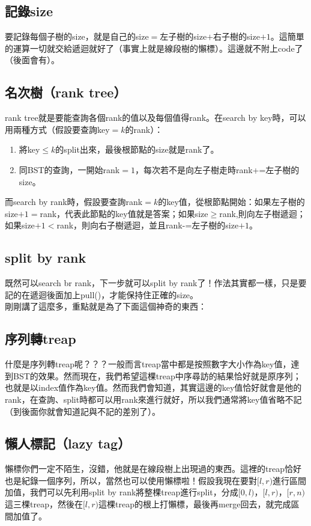\subsection{記錄size}
要記錄每個子樹的size，就是自己的size$=$左子樹的size$+$右子樹的size$+1$。這簡單的運算一切就交給遞迴就好了（事實上就是線段樹的懶標）。這邊就不附上code了（後面會有）。
\subsection{名次樹（rank tree）}
rank tree就是要能查詢各個rank的值以及每個值得rank。在search by key時，可以用兩種方式（假設要查詢key$=k$的rank）：
\begin{enumerate}
\item 將key$\leq k$的split出來，最後根節點的size就是rank了。
\item 同BST的查詢，一開始rank$=1$，每次若不是向左子樹走時rank+=左子樹的size。
\end{enumerate}
而search by rank時，假設要查詢rank$=k$的key值，從根節點開始：如果左子樹的size$+1=$rank，代表此節點的key值就是答案；如果size$\geq $rank,則向左子樹遞迴；如果size$+1<$rank，則向右子樹遞迴，並且rank-=左子樹的size$+1$。
\subsection{split by rank}
既然可以search br rank，下一步就可以split by rank了！作法其實都一樣，只是要記的在遞迴後面加上pull()，才能保持住正確的size。\\

剛剛講了這麼多，重點就是為了下面這個神奇的東西：
\subsection{序列轉treap}
什麼是序列轉treap呢？？？一般而言treap當中都是按照數字大小作為key值，達到BST的效果。然而現在，我們希望這棵treap中序尋訪的結果恰好就是原序列；也就是以index值作為key值。然而我們會知道，其實這邊的key值恰好就會是他的rank，在查詢、split時都可以用rank來進行就好，所以我們通常將key值省略不記（到後面你就會知道記與不記的差別了）。
\subsection{懶人標記（lazy tag）}
懶標你們一定不陌生，沒錯，他就是在線段樹上出現過的東西。這裡的treap恰好也是紀錄一個序列，所以，當然也可以使用懶標啦！假設我現在要對$[l,r)$進行區間加值，我們可以先利用split by rank將整棵treap進行split，分成$[0,l)$，$[l,r)$，$[r,n)$這三棵treap，然後在$[l,r)$這棵treap的根上打懶標，最後再merge回去，就完成區間加值了。
